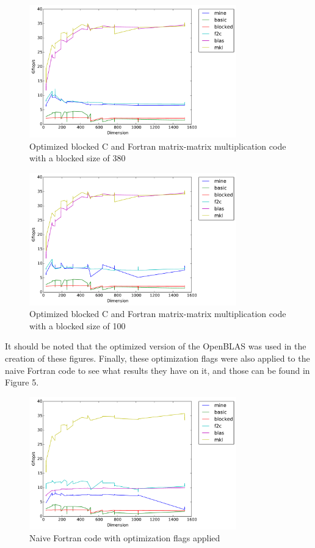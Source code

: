 \documentclass{article}
\begin{document}
\begin{figure}[H]
  \centering
    \includegraphics[width=0.8\textwidth]{c_f_blocked_opt_flags_b380}
    \caption{Optimized blocked C and Fortran matrix-matrix multiplication code with a blocked size of 380}
\end{figure}

\begin{figure}[H]
  \centering
    \includegraphics[width=0.8\textwidth]{c_f_blocked_opt_flags_b100}
    \caption{Optimized blocked C and Fortran matrix-matrix multiplication code with a blocked size of 100}
\end{figure}

\noindent  It should be noted that the optimized version of the OpenBLAS was used in the creation of these figures. Finally, these optimization flags were also applied to the naive Fortran code to see what results they have on it, and those can be found in Figure 5.

\begin{figure}[H]
  \centering
    \includegraphics[width=0.8\textwidth]{naive_fortran_opt_flags}
    \caption{Naive Fortran code with optimization flags applied}
\end{figure}
\end{document}
